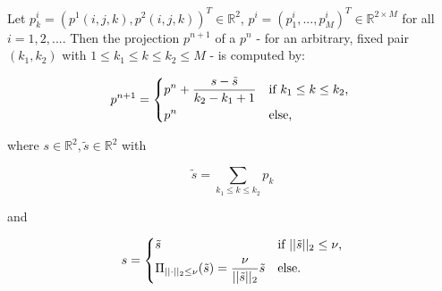             \begin{algorithm}\label{alg:softshrinkage}
                Let $p^{i}_{k} = (p^{1}(i, j, k), p^{2}(i, j, k))^{T} \in \mathbb{R}^{2}$, $p^{i} = (p^{i}_{1}, ..., p^{i}_{M})^{T} \in \mathbb{R}^{2 \times M}$ for all $i = 1, 2, ...$. Then the projection $p^{n+1}$ of a $p^{n}$ - for an arbitrary, fixed pair $(k_{1}, k_{2})$ with $1 \le k_{1} \le k \le k_{2} \le M$ - is computed by:

                    \[
                        p^{n+1} =
                            \begin{dcases*}
                                p^{n} + \frac{s - \tilde{s}}{k_{2} - k_{1} + 1} & \textnormal{if $k_{1} \le k \le k_{2}$}, \\
                                p^{n} & \textnormal{else},
                            \end{dcases*}
                    \]

                where $s \in \mathbb{R}^{2}, \tilde{s} \in \mathbb{R}^{2}$ with

                    $$\tilde{s} = \sum_{k_{1} \le k \le k_{2}} p_{k}$$

                and

                    \[
                        s =
                            \begin{dcases*}
                                \tilde{s} & \textnormal{if $||\tilde{s}||_{2} \le \nu$},\\
                                \Pi_{||\cdot||_{2} \le \nu}(\tilde{s}) = \frac{\nu}{||\tilde{s}||_{2}} \tilde{s} & \textnormal{else}.
                            \end{dcases*}
                    \]

            \end{algorithm}

